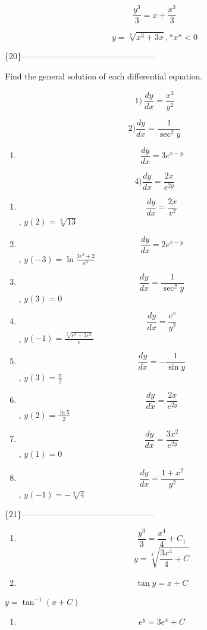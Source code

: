 \documentclass[
]{article}
\providecommand{\tightlist}{%
  \setlength{\itemsep}{0pt}\setlength{\parskip}{0pt}}
\begin{document}
\[\frac{y^3}{3} = x + \frac{x^3}{3}\]

\[y = \sqrt[3]{x^3 + 3x}, *x* < 0\]

\{20\}------------------------------------------------

Find the general solution of each differential equation.

\[1) \ \frac{dy}{dx} = \frac{x^3}{y^2}\]

\[2) \frac{dy}{dx} = \frac{1}{\sec^2 y}\]

\begin{enumerate}
\def\labelenumi{\arabic{enumi})}
\setcounter{enumi}{2}
\tightlist
\item
  \[\frac{dy}{dx} = 3e^{x-y}\]
\end{enumerate}

\[4) \frac{dy}{dx} = \frac{2x}{e^{2y}}\]

\begin{enumerate}
\def\labelenumi{\arabic{enumi})}
\setcounter{enumi}{4}
\item
  \[\frac{dy}{dx} = \frac{2x}{v^2}\] , \(y(2) = \sqrt[3]{13}\)
\item
  \[\frac{dy}{dx} = 2e^{x-y}\] , \(y(-3) = \ln \frac{3e^3 + 2}{e^3}\)
\item
  \[\frac{dy}{dx} = \frac{1}{\sec^2 y}\] , \(y(3) = 0\)
\item
  \[\frac{dy}{dx} = \frac{e^x}{y^2}\] ,
  \(y(-1) = \frac{\sqrt[3]{e^3 + 3e^2}}{e}\)
\item
  \[\frac{dy}{dx} = -\frac{1}{\sin y}\] , \(y(3) = \frac{\pi}{2}\)
\item
  \[\frac{dy}{dx} = \frac{2x}{e^{2y}}\] , \(y(2) = \frac{\ln 5}{2}\)
\item
  \[\frac{dy}{dx} = \frac{3x^2}{e^{2y}}\] , \(y(1) = 0\)
\item
  \[\frac{dy}{dx} = \frac{1+x^2}{y^2}\] , \(y(-1) = -\sqrt[3]{4}\)
\end{enumerate}

\{21\}------------------------------------------------

\begin{enumerate}
\def\labelenumi{\arabic{enumi})}
\item
  \[\frac{y^3}{3} = \frac{x^4}{4} + C_1\]
  \[y = \sqrt[3]{\frac{3x^4}{4} + C}\]
\item
  \[\tan y = x + C\]
\end{enumerate}

\(y = \tan^{-1} (x + C)\)

\begin{enumerate}
\def\labelenumi{\arabic{enumi})}
\setcounter{enumi}{2}
\tightlist
\item
  \[e^y = 3e^x + C\]
\end{enumerate}
\end{document}

